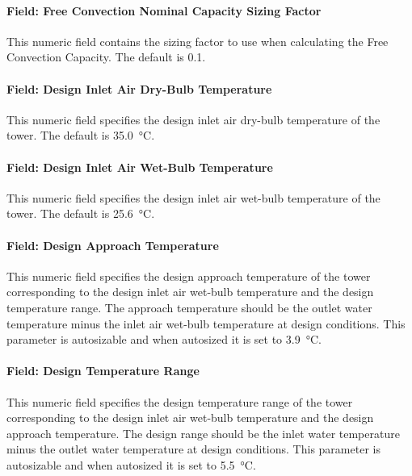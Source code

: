 \paragraph{Field: Free Convection Nominal Capacity Sizing Factor}\label{field-free-convection-nominal-capacity-sizing-factor-1}

This numeric field contains the sizing factor to use when calculating the Free Convection Capacity. The default is 0.1.

\paragraph{Field: Design Inlet Air Dry-Bulb Temperature}\label{field-design-inlet-air-drybulb-temperature-1}

This numeric field specifies the design inlet air dry-bulb temperature of the tower. The default is \SI{35.0}{\celsius}.

\paragraph{Field: Design Inlet Air Wet-Bulb Temperature}\label{field-design-inlet-air-wetbulb-temperature-1}

This numeric field specifies the design inlet air wet-bulb temperature of the tower. The default is \SI{25.6}{\celsius}.

\paragraph{Field: Design Approach Temperature}\label{field-design-approach-temperature-1}

This numeric field specifies the design approach temperature of the tower corresponding to the design inlet air wet-bulb temperature and the design temperature range.
The approach temperature should be the outlet water temperature minus the inlet air wet-bulb temperature at design conditions.
This parameter is autosizable and when autosized it is set to \SI{3.9}{\celsius}.

\paragraph{Field: Design Temperature Range}\label{field-design-temperature-range-1}

This numeric field specifies the design temperature range of the tower corresponding to the design inlet air wet-bulb temperature and the design approach temperature.
The design range  should be the inlet water temperature minus the outlet water temperature at design conditions.
This parameter is autosizable and when autosized it is set to \SI{5.5}{\celsius}.

